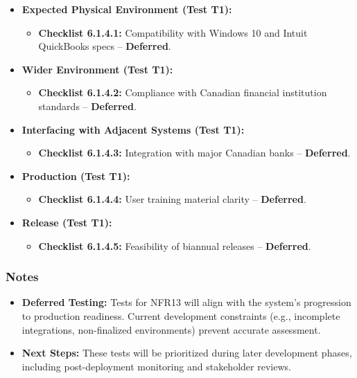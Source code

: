 \documentclass[12pt, titlepage]{article}
\begin{document}
\begin{itemize}
    \item \textbf{Expected Physical Environment (Test T1):}  
    \begin{itemize}
        \item \textbf{Checklist 6.1.4.1:} Compatibility with Windows 10 and Intuit QuickBooks specs – \textbf{Deferred}.  
    \end{itemize}
    
    \item \textbf{Wider Environment (Test T1):}  
    \begin{itemize}
        \item \textbf{Checklist 6.1.4.2:} Compliance with Canadian financial institution standards – \textbf{Deferred}.  
    \end{itemize}
    
    \item \textbf{Interfacing with Adjacent Systems (Test T1):}  
    \begin{itemize}
        \item \textbf{Checklist 6.1.4.3:} Integration with major Canadian banks – \textbf{Deferred}.  
    \end{itemize}
    
    \item \textbf{Production (Test T1):}  
    \begin{itemize}
        \item \textbf{Checklist 6.1.4.4:} User training material clarity – \textbf{Deferred}.  
    \end{itemize}
    
    \item \textbf{Release (Test T1):}  
    \begin{itemize}
        \item \textbf{Checklist 6.1.4.5:} Feasibility of biannual releases – \textbf{Deferred}.  
    \end{itemize}
\end{itemize}

\subsubsection*{Notes}  
\begin{itemize}
    \item \textbf{Deferred Testing:} Tests for NFR13 will align with the system’s progression to production readiness. Current development constraints (e.g., incomplete integrations, non-finalized environments) prevent accurate assessment.  
    \item \textbf{Next Steps:} These tests will be prioritized during later development phases, including post-deployment monitoring and stakeholder reviews.  
\end{itemize}
\end{document}
